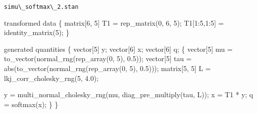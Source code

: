 \documentclass[
  letterpaper,
  DIV=11,
  numbers=noendperiod]{scrartcl}
\newenvironment{Shaded}{\begin{snugshade}}{\end{snugshade}}
\newcommand{\AttributeTok}[1]{\textcolor[rgb]{0.40,0.45,0.13}{#1}}
\newcommand{\DataTypeTok}[1]{\textcolor[rgb]{0.68,0.00,0.00}{#1}}
\newcommand{\DecValTok}[1]{\textcolor[rgb]{0.68,0.00,0.00}{#1}}
\newcommand{\FloatTok}[1]{\textcolor[rgb]{0.68,0.00,0.00}{#1}}
\newcommand{\FunctionTok}[1]{\textcolor[rgb]{0.28,0.35,0.67}{#1}}
\newcommand{\KeywordTok}[1]{\textcolor[rgb]{0.00,0.23,0.31}{#1}}
\newcommand{\NormalTok}[1]{\textcolor[rgb]{0.00,0.23,0.31}{#1}}
\newcommand{\OtherTok}[1]{\textcolor[rgb]{0.00,0.23,0.31}{#1}}
\newcommand{\SpecialCharTok}[1]{\textcolor[rgb]{0.37,0.37,0.37}{#1}}
\newcommand{\StringTok}[1]{\textcolor[rgb]{0.13,0.47,0.30}{#1}}
\begin{document}
\begin{codelisting}

\caption{\texttt{simu\textbackslash\_softmax\textbackslash\_2.stan}}

\begin{Shaded}
\begin{Highlighting}[]
\KeywordTok{transformed data}\NormalTok{ \{}
  \DataTypeTok{matrix}\NormalTok{[}\DecValTok{6}\NormalTok{, }\DecValTok{5}\NormalTok{] T1 = rep\_matrix(}\DecValTok{0}\NormalTok{, }\DecValTok{6}\NormalTok{, }\DecValTok{5}\NormalTok{);}
\NormalTok{  T1[}\DecValTok{1}\NormalTok{:}\DecValTok{5}\NormalTok{,}\DecValTok{1}\NormalTok{:}\DecValTok{5}\NormalTok{] = identity\_matrix(}\DecValTok{5}\NormalTok{);}
\NormalTok{\}}

\KeywordTok{generated quantities}\NormalTok{ \{}
  \DataTypeTok{vector}\NormalTok{[}\DecValTok{5}\NormalTok{] y;}
  \DataTypeTok{vector}\NormalTok{[}\DecValTok{6}\NormalTok{] x;}
  \DataTypeTok{vector}\NormalTok{[}\DecValTok{6}\NormalTok{] q;}
\NormalTok{  \{}
    \DataTypeTok{vector}\NormalTok{[}\DecValTok{5}\NormalTok{] mu = to\_vector(normal\_rng(rep\_array(}\DecValTok{0}\NormalTok{, }\DecValTok{5}\NormalTok{), }\FloatTok{0.5}\NormalTok{));}
    \DataTypeTok{vector}\NormalTok{[}\DecValTok{5}\NormalTok{] tau = abs(to\_vector(normal\_rng(rep\_array(}\DecValTok{0}\NormalTok{, }\DecValTok{5}\NormalTok{), }\FloatTok{0.5}\NormalTok{)));}
    \DataTypeTok{matrix}\NormalTok{[}\DecValTok{5}\NormalTok{, }\DecValTok{5}\NormalTok{] L = lkj\_corr\_cholesky\_rng(}\DecValTok{5}\NormalTok{, }\FloatTok{4.0}\NormalTok{);}

\NormalTok{    y = multi\_normal\_cholesky\_rng(mu, diag\_pre\_multiply(tau, L));}
\NormalTok{    x = T1 * y;}
\NormalTok{    q = softmax(x);}
\NormalTok{  \}}
\NormalTok{\}}
\end{Highlighting}
\end{Shaded}

\end{codelisting}

\begin{Shaded}
\end{Shaded}
\end{document}

